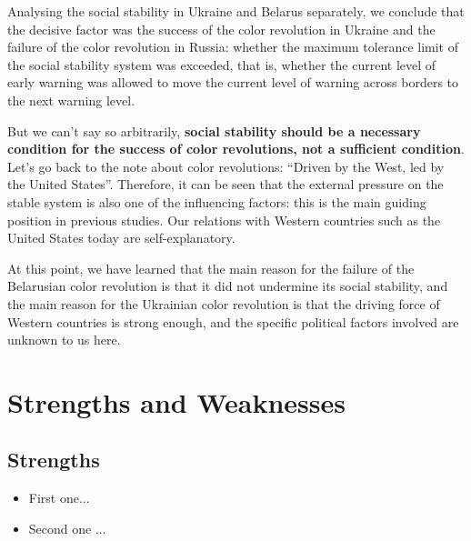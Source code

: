 \documentclass[12pt]{article}  %
\begin{document}
Analysing the social stability in Ukraine and Belarus separately, we conclude that the decisive factor was the success of the color revolution in Ukraine and the failure of the color revolution in Russia: whether the maximum tolerance limit of the social stability system was exceeded, that is, whether the current level of early warning was allowed to move the current level of warning across borders to the next warning level.

But we can't say so arbitrarily, \textbf{social stability should be a necessary condition for the success of color revolutions, not a sufficient condition}. Let's go back to the note about color revolutions: ``Driven by the West, led by the United States''. Therefore, it can be seen that the external pressure on the stable system is also one of the influencing factors: this is the main guiding position in previous studies. Our relations with Western countries such as the United States today are self-explanatory.

At this point, we have learned that the main reason for the failure of the Belarusian color revolution is that it did not undermine its social stability, and the main reason for the Ukrainian color revolution is that the driving force of Western countries is strong enough, and the specific political factors involved are unknown to us here.
\newpage
\section{Strengths and Weaknesses}
\subsection{Strengths}
\begin{itemize}
    \item First one...
    \item Second one ...
\end{itemize}
\end{document}
